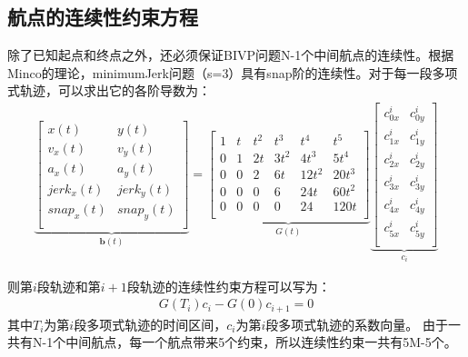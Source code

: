 \documentclass[master,academic]{ysuthesis} %
\begin{document}
		\subsection{航点的连续性约束方程} 
		除了已知起点和终点之外，还必须保证BIVP问题N-1个中间航点的连续性。根据Minco的理论，minimumJerk问题（s=3）具有snap阶的连续性。对于每一段多项式轨迹，可以求出它的各阶导数为：
		\begin{equation}
			\begin{aligned}
				\underbrace{\begin{bmatrix}
					x(t)& y(t)\\
					v_x(t)& v_y(t)\\
					a_x(t)& a_y(t)\\
					jerk_x(t)& jerk_y(t)\\
					snap_x(t)& snap_y(t)\\
				\end{bmatrix}}_{\mathbf{b}(t) }
					= \underbrace{\begin{bmatrix}
						1&		t&		t^2&		t^3&		t^4&		t^5\\
						0&		1&		2t&		3t^2&		4t^3&		5t^4\\
						0&		0&		2&		6t&		12t^2&		20t^3\\
						0&		0&		0&		6&		24t&		60t^2\\
						0&		0&		0&		0&		24&		120t\\
					\end{bmatrix}}_{G(t)}
					  \underbrace{\begin{bmatrix}
						c_{0x}^{i}&		c_{0y}^{i}\\
						c_{1x}^{i}&		c_{1y}^{i}\\
						c_{2x}^{i}&		c_{2y}^{i}\\
						c_{3x}^{i}&		c_{3y}^{i}\\
						c_{4x}^{i}&		c_{4y}^{i}\\
						c_{5x}^{i}&		c_{5y}^{i}\\
					\end{bmatrix}}_{c_i}
			\end{aligned}
		\end{equation}
		
		则第$i$段轨迹和第$i+1$段轨迹的连续性约束方程可以写为：
		\begin{equation}
			\begin{aligned}
				G(T_i)c_i-G(0)c_{i+1} = 0
			\end{aligned}
		\end{equation}
		其中$T_i$为第$i$段多项式轨迹的时间区间，$c_i$为第$i$段多项式轨迹的系数向量。
		由于一共有N-1个中间航点，每一个航点带来5个约束，所以连续性约束一共有5M-5个。
		
\end{document}
